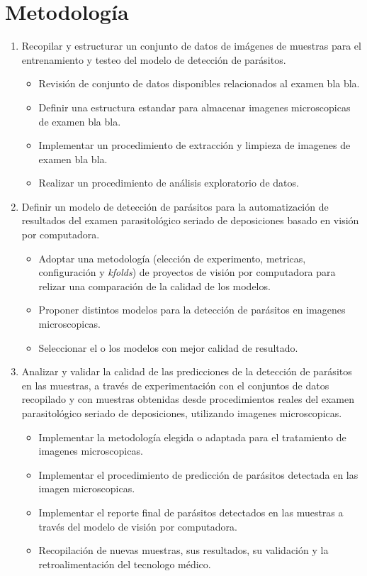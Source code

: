 \documentclass[letter,12pt]{report}
\begin{document}
\section{Metodología}
\begin{enumerate}\justifying
    \item Recopilar y estructurar un conjunto de datos de imágenes de muestras para el entrenamiento y testeo del modelo de detección de parásitos.
        \begin{itemize}
            \item Revisión de conjunto de datos disponibles relacionados al examen bla
                bla.
            \item Definir una estructura estandar para almacenar imagenes microscopicas
                de examen bla bla.
            \item Implementar un procedimiento de extracción y limpieza de imagenes de
                examen bla bla.
            \item Realizar un procedimiento de análisis exploratorio de datos.
        \end{itemize}

  \item Definir un modelo de detección de parásitos para la automatización de resultados del examen parasitológico seriado de deposiciones basado en visión por computadora.
      \begin{itemize}
          \item Adoptar una metodología (elección de experimento, metricas, configuración
              y \textit{kfolds}) de proyectos de visión por computadora para relizar una
              comparación de la calidad de los modelos.
          \item Proponer distintos modelos para la detección de parásitos en imagenes
              microscopicas.
          \item Seleccionar el o los modelos con mejor calidad de resultado.
      \end{itemize}

  \item Analizar y validar la calidad de las predicciones de la detección de parásitos en las muestras, a través de experimentación con el conjuntos de datos recopilado y con muestras obtenidas desde procedimientos reales del examen parasitológico seriado de deposiciones, utilizando imagenes microscopicas.
      \begin{itemize}
          \item Implementar la metodología elegida o adaptada para el tratamiento de
              imagenes microscopicas.
          \item Implementar el procedimiento de predicción de parásitos detectada en las
              imagen microscopicas.
          \item Implementar el reporte final de parásitos detectados en las muestras a
              través del modelo de visión por computadora.
          \item Recopilación de nuevas muestras, sus resultados, su validación y la
              retroalimentación del tecnologo médico.
      \end{itemize}
\end{enumerate}
\end{document}

